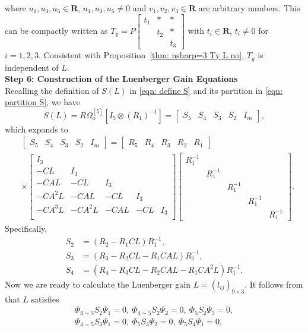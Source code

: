\documentclass[sort&compress]{elsarticle}
\newcommand\Pio{\mathit\Omega_\mathrm o}
\newcommand\R{\mathbf R}
\newcommand\PHi{\mathit\Phi}
\newcommand\PSi{\mathit\Psi}
\begin{document}
where $u_1,u_3,u_5\in\R$, $u_1,u_3,u_5\ne0$
and $v_1,v_2,v_3\in\R$ are arbitrary numbers.
This can be compactly written as
$T_y=P\begin{bmatrix}t_1&*&*\\ &t_2&*\\ &&t_3\end{bmatrix}$ with $t_i\in\R$, $t_i \neq 0$ for $i=1,2,3$.
Consistent with Proposition~\ref{thm: nsharp=3 Ty L no}, $T_y$ is independent of $L$.
\\
\textbf{Step 6: Construction of the Luenberger Gain Equations}
\\
Recalling the definition of $S(L)$ in \eqref{eqn: define S} and its partition in \eqref{eqn: partition S}, we have
\[
S(L) = R\Pio^{[5]}[I_5\otimes(R_1)^{-1}] = \begin{bmatrix}S_5&S_4&S_3&S_2&I_m\end{bmatrix},
\]
which expands to
\begin{align*}
&\begin{bmatrix}S_5&S_4&S_3&S_2&I_m\end{bmatrix}
=\begin{bmatrix}R_5&R_4&R_3&R_2&R_1\end{bmatrix}\\
&\times
\begin{bmatrix}
I_3&&&&\\
-CL&I_3&&&\\
-CAL&-CL&I_3&&\\
-CA^2L&-CAL&-CL&I_3&\\
-CA^3L&-CA^2L&-CAL&-CL&I_3\\
\end{bmatrix}
\begin{bmatrix}
R_1^{-1}&&&&\\
&R_1^{-1}&&&\\
&&R_1^{-1}&&\\
&&&R_1^{-1}&\\
&&&&R_1^{-1}
\end{bmatrix}.
\end{align*}
Specifically,
\begin{align*}
S_2
&
= (R_2 - R_1CL)R_1^{-1},
\\
S_3
&
= (R_3 - R_2CL - R_1CAL)R_1^{-1},
\\
S_4
&
= (R_4 - R_3CL - R_2CAL - R_1CA^2L)R_1^{-1}.
\end{align*}
Now we are ready to calculate the Luenberger gain $L=(l_{ij})_{9\times3}$.
It follows from  that $L$ satisfies
\begin{equation}\label{eqn: example n=9 m=3 solve L}
\begin{gathered}
\PHi_{3\sim5}S_2\PSi_1=0,\
\PHi_{4\sim5}S_2\PSi_2=0,\
\PHi_5S_2\PSi_3=0,\\
\PHi_{4\sim5}S_3\PSi_1=0,\
\PHi_5S_3\PSi_2=0,\
\PHi_5S_4\PSi_1=0.
\end{gathered}
\end{equation}
\end{document}
